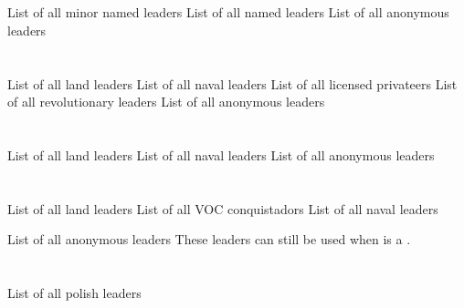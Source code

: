 \section{\paysmajeurAutriche}

\aparag List of all minor named leaders 
\aparag List of all named leaders 
\aparag List of all anonymous leaders \listanonymehabsbourgM




\section{\paysmajeurFrance}

\aparag List of all land leaders 
\aparag List of all naval leaders 
\aparag List of all licensed privateers 
\aparag List of all revolutionary leaders 
\aparag List of all anonymous leaders \listanonymefrance




\section{\paysmajeurEspagne}

\aparag List of all land leaders 
\aparag List of all naval leaders 
\aparag List of all anonymous leaders \listanonymeespagne




\section{\paysmajeurHollande}

\aparag List of all land leaders 
\aparag List of all VOC conquistadors 
\aparag List of all naval leaders 

\aparag List of all anonymous leaders
\bparag These leaders can still be used when \paysHollande is a \MIN.
\listanonymehollande




\section{\paysmajeurPologne}

\aparag List of all polish leaders 

